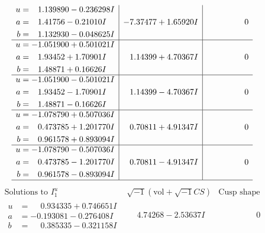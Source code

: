 \documentclass[1p]{elsarticle_modified}
\theoremstyle{definition}
\newcommand{\I}{\sqrt{-1}}
\begin{document}
$$\begin{array}{c|c|c}
\begin{aligned}
u &= \phantom{-}1.139890 - 0.236298 I \\
a &= \phantom{-}1.41756 - 0.21010 I \\
b &= \phantom{-}1.132930 - 0.048625 I\end{aligned}
 & -7.37477 + 1.65920 I & \phantom{-0.000000 } 0 \\ \hline\begin{aligned}
u &= -1.051900 + 0.501021 I \\
a &= \phantom{-}1.93452 + 1.70901 I \\
b &= \phantom{-}1.48871 + 0.16626 I\end{aligned}
 & \phantom{-}1.14399 + 4.70367 I & \phantom{-0.000000 } 0 \\ \hline\begin{aligned}
u &= -1.051900 - 0.501021 I \\
a &= \phantom{-}1.93452 - 1.70901 I \\
b &= \phantom{-}1.48871 - 0.16626 I\end{aligned}
 & \phantom{-}1.14399 - 4.70367 I & \phantom{-0.000000 } 0 \\ \hline\begin{aligned}
u &= -1.078790 + 0.507036 I \\
a &= \phantom{-}0.473785 + 1.201770 I \\
b &= \phantom{-}0.961578 + 0.893094 I\end{aligned}
 & \phantom{-}0.70811 + 4.91347 I & \phantom{-0.000000 } 0 \\ \hline\begin{aligned}
u &= -1.078790 - 0.507036 I \\
a &= \phantom{-}0.473785 - 1.201770 I \\
b &= \phantom{-}0.961578 - 0.893094 I\end{aligned}
 & \phantom{-}0.70811 - 4.91347 I & \phantom{-0.000000 } 0\\
 \hline 
 \end{array}$$\newpage$$\begin{array}{c|c|c}  
\text{Solutions to }I^u_{1}& \I (\text{vol} + \sqrt{-1}CS) & \text{Cusp shape}\\
 \hline 
\begin{aligned}
u &= \phantom{-}0.934335 + 0.746651 I \\
a &= -0.193081 - 0.276408 I \\
b &= \phantom{-}0.385335 - 0.321158 I\end{aligned}
 & \phantom{-}4.74268 - 2.53637 I & \phantom{-0.000000 } 0 \\ \hline\begin{aligned}

\end{aligned}
\end{array}$$
\end{document}
